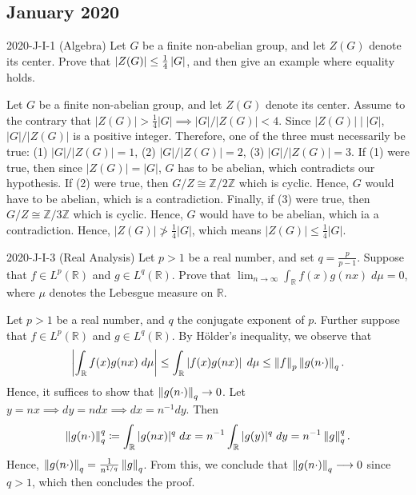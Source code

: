\documentclass{article}
\begin{document}
\subsection{January 2020}
\begin{prb}{2020-J-I-1 (Algebra)}
	Let $G$ be a finite non-abelian group, and let $Z(G)$ denote its center. Prove that $\left| Z(G) \right| \leq \frac{1}{4}\left| G \right|$, and then give an example where equality holds. 
\end{prb}
\begin{solutions}
	Let $G$ be a finite non-abelian group, and let $Z(G)$ denote its center. Assume to the contrary that $|Z(G)| > \frac{1}{4}|G| \implies |G|/|Z(G)| < 4$. Since $|Z(G)| \mid |G|$, $|G|/|Z(G)|$ is a positive integer. Therefore, one of the three must necessarily be true: (1) $|G|/|Z(G)| = 1$, (2) $|G|/|Z(G)| = 2$, (3) $|G|/|Z(G)| = 3$. If (1) were true, then since $|Z(G)| = |G|$, $G$ has to be abelian, which contradicts our hypothesis. If (2) were true, then $G/Z \cong \mathbb{Z}/2\mathbb{Z}$ which is cyclic. Hence, $G$ would have to be abelian, which is a contradiction. Finally, if (3) were true, then $G/Z \cong \mathbb{Z}/3\mathbb{Z}$ which is cyclic. Hence, $G$ would have to be abelian, which ia a contradiction. Hence, $|Z(G)| \not> \frac{1}{4}|G|$, which means $|Z(G)| \leq \frac{1}{4}|G|$. 
\end{solutions}
\begin{prb}{2020-J-I-3 (Real Analysis)}
	Let $p > 1$ be a real number, and set $q = \frac{p}{p - 1}$. Suppose that $f \in L^{p}(\mathbb{R})$ and $g \in L^{q}(\mathbb{R})$. Prove that $\lim_{n \to \infty}\int_{\mathbb{R}}f(x)g(nx)\;d\mu =0$, where $\mu$ denotes the Lebesgue measure on $\mathbb{R}$. 
\end{prb}
\begin{solutions}
	Let $p > 1$ be a real number, and $q$ the conjugate exponent of $p$. Further suppose that $f \in L^{p}(\mathbb{R})$ and $g \in L^{q}(\mathbb{R})$. By H\"older's inequality, we observe that 
		\begin{equation}
			\left| \int_{\mathbb{R}}f(x)g(nx)\;d\mu \right| \leq \int_{\mathbb{R}}\left| f(x)g(nx) \right|\;d\mu \leq \left\Vert f \right\Vert_{p}\left\Vert g(n\cdot) \right\Vert_{q}. 
		\end{equation}
	Hence, it suffices to show that $\left\Vert g(n\cdot) \right\Vert_{q} \to 0$. Let $y = nx \implies dy =ndx \implies dx = n^{-1}dy$. Then 
		\begin{equation}
			\left\Vert g(n\cdot) \right\Vert_{q}^{q} \coloneqq \int_{\mathbb{R}}|g(nx)|^{q}\;dx = n^{-1}\int_{\mathbb{R}}|g(y)|^{q}\;dy = n^{-1}\left\Vert g \right\Vert_{q}^{q}. 
		\end{equation}
	Hence, $\left\Vert g(n \cdot) \right\Vert_{q} = \frac{1}{n^{1/q}} \left\Vert g \right\Vert_{q}$. From this, we conclude that $\left\Vert g(n \cdot ) \right\Vert_{q} \longrightarrow 0$ since $q > 1$, which then concludes the proof. 
\end{solutions}
\end{document}
